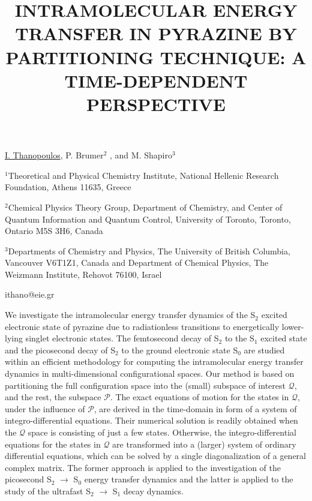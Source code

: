 \title{INTRAMOLECULAR ENERGY TRANSFER IN PYRAZINE BY PARTITIONING TECHNIQUE: A TIME-DEPENDENT PERSPECTIVE}

\underline{I. Thanopoulos}, P. Brumer$^2$ , and M. Shapiro$^3$ 

{\normalsize{
\vspace{-4mm}$^1$Theoretical and Physical Chemistry Institute, National Hellenic Research Foundation, Athens 11635, Greece

\vspace{-4mm}$^2$Chemical Physics Theory Group, Department of Chemistry, and Center of Quantum Information and Quantum Control,
University of Toronto, Toronto, Ontario M5S 3H6, Canada

\vspace{-4mm}$^3$Departments of Chemistry and Physics, The University of British Columbia, Vancouver V6T1Z1, Canada and Department of Chemical Physics, The Weizmann Institute, Rehovot 76100, Israel

\email ithano@eie.gr}}

We investigate the intramolecular energy transfer dynamics of the S$_2$ excited electronic state of
pyrazine due to radiationless transitions to energetically lower-lying singlet electronic states. The
femtosecond decay of S$_2$ to the S$_1$ excited state and the picosecond decay of S$_2$ to the ground
electronic state S$_0$ are studied within an efficient methodology for computing the intramolecular
energy transfer dynamics in multi-dimensional configurational spaces. Our method is based on
partitioning the full configuration space into the (small) subspace of interest $\mathcal{Q}$, and the rest, the
subspace $\mathcal{P}$. The exact equations of motion for the states in $\mathcal{Q}$, under the influence of $\mathcal{P}$, are
derived in the time-domain in form of a system of integro-differential equations. Their numerical
solution is readily obtained when the $\mathcal{Q}$ space is consisting of just a few states. Otherwise, the
integro-differential equations for the states in $\mathcal{Q}$ are transformed into a (larger) system of ordinary
differential equations, which can be solved by a single diagonalization of a general complex matrix.
The former approach is applied to the investigation of the picosecond S$_2$ $\longrightarrow$ S$_0$ energy transfer
dynamics and the latter is applied to the study of the ultrafast S$_2$ $\longrightarrow$ S$_1$ decay dynamics.


\vspace{\baselineskip} 